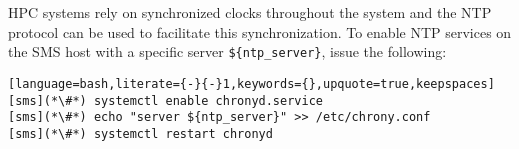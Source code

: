 HPC systems rely on synchronized clocks throughout the system and the
NTP protocol can be used to facilitate this synchronization. To enable NTP
services on the SMS host with a specific server \texttt{\$\{ntp\_server\}},
issue the following:

\begin{lstlisting}[language=bash,literate={-}{-}1,keywords={},upquote=true,keepspaces]
[sms](*\#*) systemctl enable chronyd.service
[sms](*\#*) echo "server ${ntp_server}" >> /etc/chrony.conf
[sms](*\#*) systemctl restart chronyd
\end{lstlisting}
